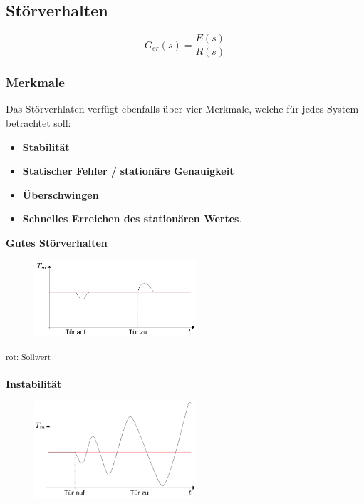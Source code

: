 \documentclass[
  10pt,
  a4paper,
  onecolumn]{article}
\providecommand{\tightlist}{%
  \setlength{\itemsep}{0pt}\setlength{\parskip}{0pt}}\usepackage{longtable,booktabs,array}
\numberwithin{equation}{section}
\begin{document}
\hypertarget{stuxf6rverhalten}{%
\subsection{Störverhalten}\label{stuxf6rverhalten}}

\[
G_{er}(s)=\frac{E(s)}{R(s)}
\]

\hypertarget{merkmale-1}{%
\subsubsection{Merkmale}\label{merkmale-1}}

Das Störverhlaten verfügt ebenfalls über vier Merkmale, welche für jedes
System betrachtet soll:

\begin{itemize}
\tightlist
\item
  \textbf{Stabilität}
\item
  \textbf{Statischer Fehler /} \textbf{stationäre Genauigkeit}
\item
  \textbf{Überschwingen}
\item
  \textbf{Schnelles Erreichen des stationären Wertes}.
\end{itemize}

\textbf{Gutes Störverhalten}

\begin{figure}[H]

{\centering \includegraphics[width=6cm,height=\textheight]{images/storverhalten/gutes_verhalten.png}

}

\end{figure}

\textsuperscript{rot: Sollwert}

\textbf{Instabilität}

\begin{figure}[H]

{\centering \includegraphics[width=6cm,height=\textheight]{images/storverhalten/storverhalten_stability.png}

}

\end{figure}
\end{document}

